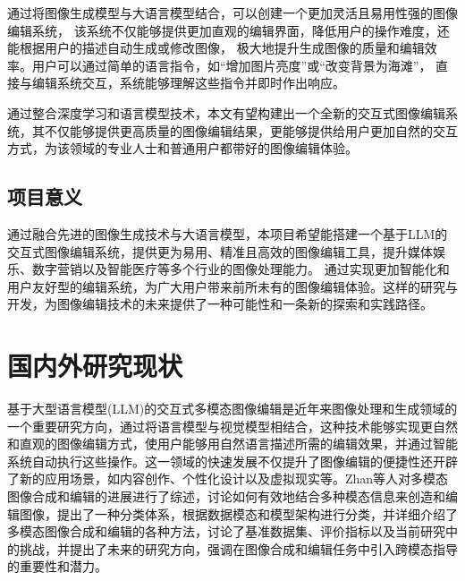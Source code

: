\documentclass[a4paper,AutoFakeBold,oneside,12pt]{book}
\begin{document}
通过将图像生成模型与大语言模型结合，可以创建一个更加灵活且易用性强的图像编辑系统，
该系统不仅能够提供更加直观的编辑界面，降低用户的操作难度，还能根据用户的描述自动生成或修改图像，
极大地提升生成图像的质量和编辑效率。用户可以通过简单的语言指令，如“增加图片亮度”或“改变背景为海滩”，
直接与编辑系统交互，系统能够理解这些指令并即时作出响应。

通过整合深度学习和语言模型技术，本文有望构建出一个全新的交互式图像编辑系统，其不仅能够提供更高质量的图像编辑结果，更能够提供给用户更加自然的交互方式，为该领域的专业人士和普通用户都带好的图像编辑体验。
\subsection{项目意义}
通过融合先进的图像生成技术与大语言模型，本项目希望能搭建一个基于LLM的交互式图像编辑系统，提供更为易用、精准且高效的图像编辑工具，提升媒体娱乐、数字营销以及智能医疗等多个行业的图像处理能力。
通过实现更加智能化和用户友好型的编辑系统，为广大用户带来前所未有的图像编辑体验。这样的研究与开发，为图像编辑技术的未来提供了一种可能性和一条新的探索和实践路径。
\section{国内外研究现状}
基于大型语言模型(LLM)的交互式多模态图像编辑是近年来图像处理和生成领域的一个重要研究方向，通过将语言模型与视觉模型相结合，这种技术能够实现更自然和直观的图像编辑方式，使用户能够用自然语言描述所需的编辑效果，并通过智能系统自动执行这些操作。这一领域的快速发展不仅提升了图像编辑的便捷性还开辟了新的应用场景，如内容创作、个性化设计以及虚拟现实等。Zhan等人\cite{zhan2022multimodal}对多模态图像合成和编辑的进展进行了综述，讨论如何有效地结合多种模态信息来创造和编辑图像，提出了一种分类体系，根据数据模态和模型架构进行分类，并详细介绍了多模态图像合成和编辑的各种方法，讨论了基准数据集、评价指标以及当前研究中的挑战，并提出了未来的研究方向，强调在图像合成和编辑任务中引入跨模态指导的重要性和潜力。
\end{document}
